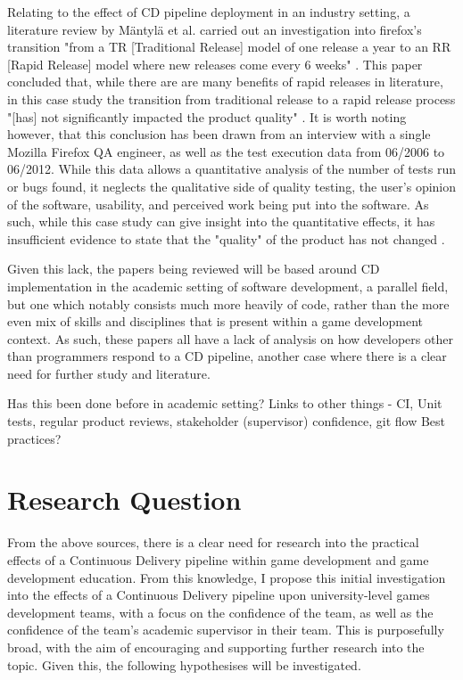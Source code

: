 \documentclass[lettersize,journal]{IEEEtran}
\begin{document}
    Relating to the effect of CD pipeline deployment in an industry setting, a literature review by M{\"a}ntyl{\"a} et al. \cite{mantyla2015rapid} carried out an investigation into firefox's transition "from a TR [Traditional Release] model of one release a year to an RR [Rapid Release] model where new releases come every 6 weeks" \cite[pg 2]{mantyla2015rapid}. This paper concluded that, while there are are many benefits of rapid releases in literature, in this case study the transition from traditional release to a rapid release process "[has] not significantly impacted the product quality" \cite[pg 40]{mantyla2015rapid}. It is worth noting however, that this conclusion has been drawn from an interview with a single Mozilla Firefox QA engineer, as well as the test execution data from 06/2006 to 06/2012. While this data allows a quantitative analysis of the number of tests run or bugs found, it neglects the qualitative side of quality testing, the user's opinion of the software, usability, and perceived work being put into the software. As such, while this case study can give insight into the quantitative effects, it has insufficient evidence to state that the "quality" of the product has not changed \cite{kan2003metrics}.

    

    Given this lack, the papers being reviewed will be based around CD implementation in the academic setting of software development, a parallel field, but one which notably consists much more heavily of code, rather than the more even mix of skills and disciplines that is present within a game development context. As such, these papers all have a lack of analysis on how developers other than programmers respond to a CD pipeline, another case where there is a clear need for further study and literature.


    Has this been done before in academic setting\cite{CDCourse2014,CDMobileDev,IndustryAcademyDenmark}? 
    Links to other things - CI\cite{CICDCD}, Unit tests, regular product reviews, stakeholder (supervisor) confidence, git flow \cite{gitBranching}
    Best practices\cite{duvall2007continuous}? 

\section{Research Question}
    From the above sources, there is a clear need for research into the practical effects of a Continuous Delivery pipeline within game development and game development education. From this knowledge, I propose this initial investigation into the effects of a Continuous Delivery pipeline upon university-level games development teams, with a focus on the confidence of the team, as well as the confidence of the team's academic supervisor in their team. 
    This is purposefully broad, with the aim of encouraging and supporting further research into the topic. Given this, the following hypothesises will be investigated.
\end{document}
